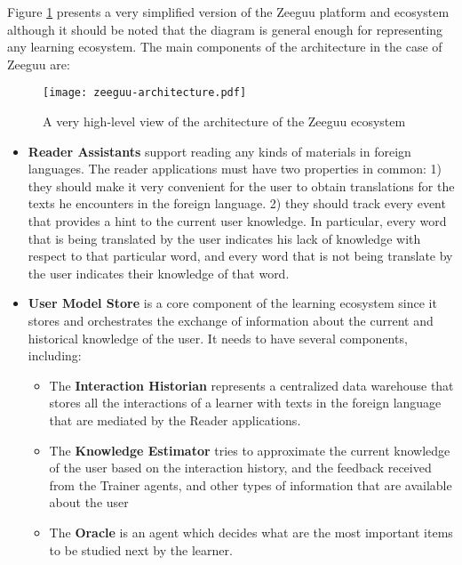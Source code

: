 \documentclass{sig-alternate-05-2015}
\begin{document}
Figure \ref{fig:architecture} presents a very simplified version of the Zeeguu platform and ecosystem although it should be noted that the diagram is general enough for representing any learning ecosystem. The main components of the architecture in the case of Zeeguu are:

\begin{figure}[h!]
	\texttt{[image: zeeguu-architecture.pdf]}
	\caption{A very high-level view of the architecture of the Zeeguu ecosystem}
	\label{fig:architecture}
\end{figure}


\begin{itemize}
	
	\item {\bf Reader Assistants} 
	support reading any kinds of materials in foreign languages. The reader applications must have two properties in common: 
		1) they should make it very convenient for the user to obtain translations for the texts he encounters in the foreign language. 
		2) they should track every event that provides a hint to the current user knowledge. In particular, every word that is being translated by the user indicates his lack of knowledge with respect to that particular word, and every word that is not being translate by the user indicates their knowledge of that word. 
	
		\item {\bf User Model Store} 
		is a core component of the learning ecosystem since it stores and orchestrates the exchange of information about the current and historical knowledge of the user. It needs to have several components, including: 

		\begin{itemize}

			\item The {\bf Interaction Historian} represents a centralized data warehouse that stores all the interactions of a learner with texts in the foreign language that are mediated by the Reader applications.

			\item The {\bf Knowledge Estimator} tries to approximate the current knowledge of the user based on the interaction history, and the feedback received from the Trainer agents, and other types of information that are available about the user

			\item The {\bf Oracle} is an agent which decides what are the most important items to be studied next by the learner. 


\end{itemize}
\end{itemize}
\end{document}
